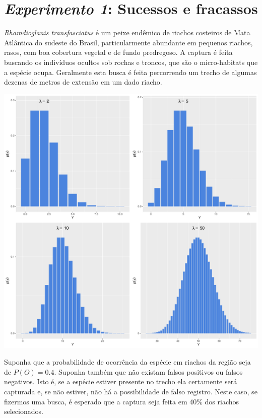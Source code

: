 \documentclass[
]{book}
\begin{document}
\hypertarget{experimento-1-sucessos-e-fracassos}{%
\section{\texorpdfstring{\emph{Experimento 1}: Sucessos e fracassos}{Experimento 1: Sucessos e fracassos}}\label{experimento-1-sucessos-e-fracassos}}

\emph{Rhamdioglanis transfasciatus} é um peixe endêmico de riachos costeiros de Mata Atlântica do sudeste do Brasil, particularmente abundante em pequenos riachos, rasos, com boa cobertura vegetal e de fundo predregoso. A captura é feita buscando os indivíduos ocultos sob rochas e troncos, que são o micro-habitats que a espécie ocupa. Geralmente esta busca é feita percorrendo um trecho de algumas dezenas de metros de extensão em um dado riacho.

\begin{center}\includegraphics{probest-cambientais_files/figure-latex/unnamed-chunk-202-1} \end{center}

Suponha que a probabilidade de ocorrência da espécie em riachos da região seja de \(P(O) = 0.4\). Suponha também que não existam falsos positivos ou falsos negativos. Isto é, se a espécie estiver presente no trecho ela certamente será capturada e, se não estiver, não há a possibilidade de falso registro. Neste caso, se fizermos uma busca, é esperado que a captura seja feita em 40\% dos riachos selecionados.
\end{document}
